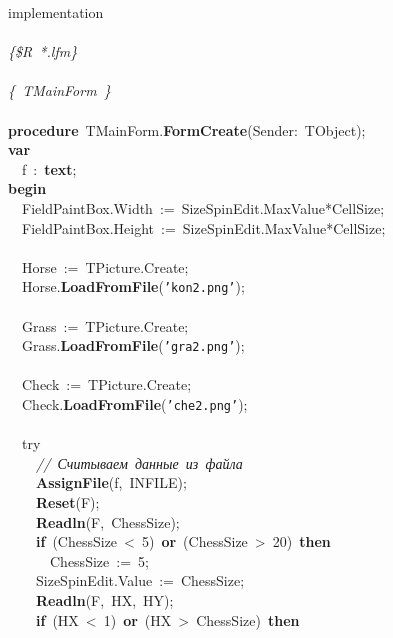\mbox{}implementation \\
\mbox{} \\
\mbox{}\textit{\{\$R\ *.lfm\}} \\
\mbox{} \\
\mbox{}\textit{\{\ TMainForm\ \}} \\
\mbox{} \\
\mbox{}\textbf{procedure}\ TMainForm.\textbf{FormCreate}(Sender:\ TObject); \\
\mbox{}\textbf{var} \\
\mbox{}\ \ f\ :\ \textbf{text}; \\
\mbox{}\textbf{begin} \\
\mbox{}\ \ FieldPaintBox.Width\ :=\ SizeSpinEdit.MaxValue*CellSize; \\
\mbox{}\ \ FieldPaintBox.Height\ :=\ SizeSpinEdit.MaxValue*CellSize; \\
\mbox{} \\
\mbox{}\ \ Horse\ :=\ TPicture.Create; \\
\mbox{}\ \ Horse.\textbf{LoadFromFile}(\texttt{'kon2.png'}); \\
\mbox{} \\
\mbox{}\ \ Grass\ :=\ TPicture.Create; \\
\mbox{}\ \ Grass.\textbf{LoadFromFile}(\texttt{'gra2.png'}); \\
\mbox{} \\
\mbox{}\ \ Check\ :=\ TPicture.Create; \\
\mbox{}\ \ Check.\textbf{LoadFromFile}(\texttt{'che2.png'}); \\
\mbox{} \\
\mbox{}\ \ try \\
\mbox{}\ \ \ \ \textit{//\ Считываем\ данные\ из\ файла} \\
\mbox{}\ \ \ \ \textbf{AssignFile}(f,\ INFILE); \\
\mbox{}\ \ \ \ \textbf{Reset}(F); \\
\mbox{}\ \ \ \ \textbf{Readln}(F,\ ChessSize); \\
\mbox{}\ \ \ \ \textbf{if}\ (ChessSize\ \textless{}\ 5)\ \textbf{or}\ (ChessSize\ \textgreater{}\ 20)\ \textbf{then} \\
\mbox{}\ \ \ \ \ \ ChessSize\ :=\ 5; \\
\mbox{}\ \ \ \ SizeSpinEdit.Value\ :=\ ChessSize; \\
\mbox{}\ \ \ \ \textbf{Readln}(F,\ HX,\ HY); \\
\mbox{}\ \ \ \ \textbf{if}\ (HX\ \textless{}\ 1)\ \textbf{or}\ (HX\ \textgreater{}\ ChessSize)\ \textbf{then} \\
